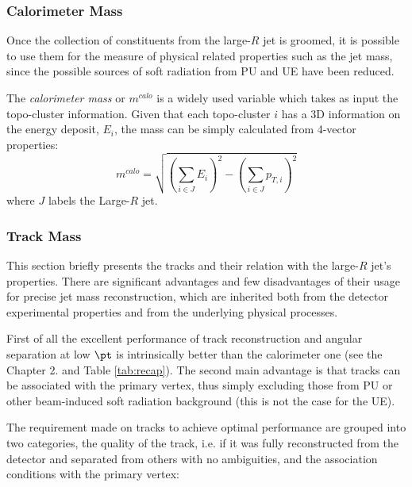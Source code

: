 \subsubsection{Calorimeter Mass}

Once the collection of constituents from the large-$R$ jet is groomed, it is possible to use them for the measure of physical related properties such as the jet mass, since the possible sources of soft radiation from PU and UE have been reduced.


The \textit{calorimeter mass} or $m^{calo}$ is a widely used variable which takes as input the topo-cluster information. Given that each topo-cluster $i$ has a 3D information on the energy deposit, $E_i$, the mass can be simply calculated from 4-vector properties:
$$m^{calo}=\sqrt{\left(\sum_{i\in J}E_i\right)^2-\left(\sum_{i\in J}p_{T,i}\right)^2} $$
where $J$ labels the Large-$R$ jet.

\subsubsection{Track Mass}
\label{sec:tracks}
This section briefly presents the tracks and their relation with the large-$R$ jet's properties.
There are significant advantages and few disadvantages of their usage for precise jet mass reconstruction, which are inherited both from the detector experimental properties and from the underlying physical processes. 

First of all the excellent performance of track reconstruction and angular separation at low $\pt$ is intrinsically better than the calorimeter one (see the Chapter 2. and Table \ref{tab:recap}).
The second main advantage is that tracks can be associated with the primary vertex, thus simply excluding those from PU or other beam-induced soft radiation background (this is not the case for the UE).

The requirement made on tracks to achieve optimal performance are grouped into two categories, the quality of the track, i.e. if it was fully reconstructed from the detector and separated from others with no ambiguities, and the association conditions with the primary vertex:

